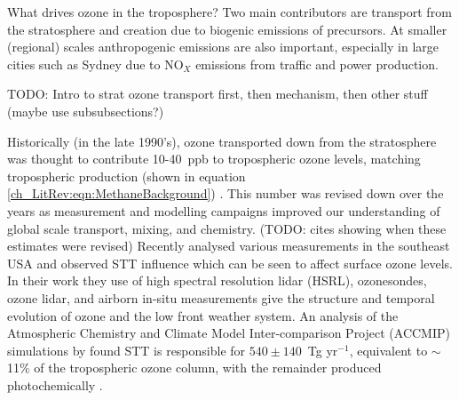     What drives ozone in the troposphere? Two main contributors are transport from the stratosphere and creation due to biogenic emissions of precursors. 
    At smaller (regional) scales anthropogenic emissions are also important, especially in large cities such as Sydney due to NO$_X$ emissions from traffic and power production.
    
    TODO: Intro to strat ozone transport first, then mechanism, then other stuff (maybe use subsubsections?)
    
    Historically (in the late 1990's), ozone transported down from the stratosphere was thought to contribute 10-40~ppb to tropospheric ozone levels, matching tropospheric production (shown in equation \ref{ch_LitRev:eqn:MethaneBackground}) \citep{Atkinson2000,Stohl2003}.
    This number was revised down over the years as measurement and modelling campaigns improved our understanding of global scale transport, mixing, and chemistry. (TODO: cites showing when these estimates were revised)
    Recently \cite{Kuang2017} analysed various measurements in the southeast USA and observed STT influence which can be seen to affect surface ozone levels.
    In their work they use of high spectral resolution lidar (HSRL), ozonesondes, ozone lidar, and airborn in-situ measurements give the structure and temporal evolution of ozone and the low front weather system.
    An analysis of the Atmospheric Chemistry and Climate Model Inter-comparison Project (ACCMIP) simulations by \citet{Young2013} found STT is responsible for $540\pm140$~Tg yr$^{-1}$, equivalent to $\sim$11\% of the tropospheric ozone column, with the remainder produced photochemically \citep{Monks2015}.
    
